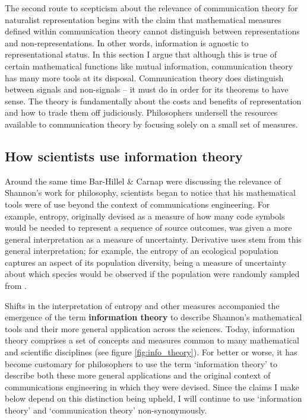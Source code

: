 \documentclass[12pt]{article}
\begin{document}
The second route to scepticism about the relevance of communication theory for naturalist representation begins with the claim that mathematical measures defined within communication theory cannot distinguish between representations and non-representations.
In other words, information is agnostic to representational status.
In this section I argue that although this is true of certain mathematical functions like mutual information, communication theory has many more tools at its disposal.
Communication theory does distinguish between signals and non-signals -- it must do in order for its theorems to have sense.
The theory is fundamentally about the costs and benefits of representation and how to trade them off judiciously.
Philosophers undersell the resources available to communication theory by focusing solely on a small set of measures.

\subsection{How scientists use information theory}\label{subsec:scientists}

Around the same time Bar-Hillel \& Carnap were discussing the relevance of Shannon's work for philosophy, scientists began to notice that his mathematical tools were of use beyond the context of communications engineering.
For example, entropy, originally devised as a measure of how many code symbols would be needed to represent a sequence of source outcomes, was given a more general interpretation as a measure of uncertainty.
Derivative uses stem from this general interpretation; for example, the entropy of an ecological population captures an aspect of its population diversity, being a measure of uncertainty about which species would be observed if the population were randomly sampled from \citep{margalef1957information}.

Shifts in the interpretation of entropy and other measures accompanied the emergence of the term \textbf{information theory} to describe Shannon's mathematical tools and their more general application across the sciences.
Today, information theory comprises a set of concepts and measures common to many mathematical and scientific disciplines (see figure \ref{fig:info_theory}).
For better or worse, it has become customary for philosophers to use the term `information theory' to describe both these more general applications and the original context of communications engineering in which they were devised.
Since the claims I make below depend on this distinction being upheld, I will continue to use `information theory' and `communication theory' non-synonymously.
\end{document}
